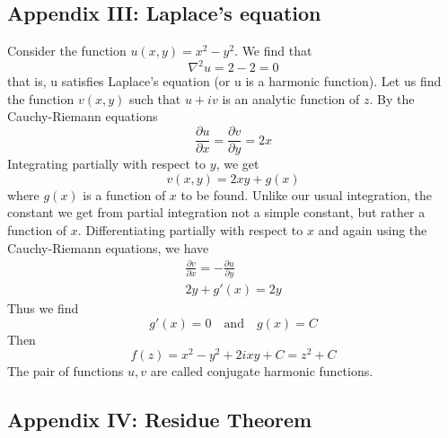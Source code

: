 \documentclass[../main.tex]{subfiles}
\begin{document}
\subsection*{Appendix III: Laplace’s equation} 
Consider the function $u(x, y) = x^2 - y^2$. We find that
\begin{equation*}
    \nabla^2u=2-2=0
\end{equation*}that is, u satisfies Laplace’s equation (or u is a harmonic function). Let us find the
function $v(x, y)$ such that $u+iv$ is an analytic function of $z$. By the Cauchy-Riemann
equations
\begin{equation*}
    \frac{\partial u}{\partial x}=\frac{\partial v}{\partial y}=2x
\end{equation*}
Integrating partially with respect to $y$, we get
\begin{equation*}
    v(x, y) = 2xy + g(x)
\end{equation*}
where $g(x)$ is a function of $x$ to be found. Unlike our usual integration, the constant we get from partial integration not a simple constant, but rather a function of $x$.  Differentiating partially with respect to $x $ and again using the Cauchy-Riemann equations, we have
\begin{align*}
    \frac{\partial v}{\partial x}=-\frac{\partial u}{\partial y}\\
    2y+g'(x)=2y
\end{align*}
Thus we find
\begin{equation*}
    g'(x)=0\quad \text{and}\quad g(x)=C
\end{equation*}
Then
\begin{equation*}
    f(z)=x^2 - y^2 + 2ixy + C = z^2 + C
\end{equation*}
The pair of functions $u, v$ are called conjugate harmonic functions.

\subsection*{Appendix IV: Residue Theorem}
\end{document}
